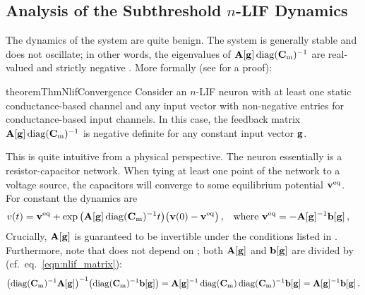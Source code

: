 \pagebreak

\subsection{Analysis of the Subthreshold $n$-LIF Dynamics}
\label{sec:nlif_subth_properties}

The dynamics of the \nlif system are quite benign.
The system is generally stable and does not oscillate; in other words, the eigenvalues of $\mathbf{A}[\mathbf{g}] \operatorname{\mathrm{diag}}({{\mathbf{C}}_\mathrm{m}})^{-1}$ are real-valued and strictly negative \citep[e.g.,][Chapter~5]{strogatz1994nonlinear}.
More formally (see  for a proof):
\begin{restatable}{theorem}{ThmNlifConvergence}
\label{thm:nlif_convergence}
Consider an $n$-LIF neuron with at least one static conductance-based channel and any input vector \vng with non-negative entries for conductance-based input channels.
In this case, the feedback matrix $\mathbf{A}[\mathbf{g}] \operatorname{\mathrm{diag}}({{\mathbf{C}}_\mathrm{m}})^{-1}$ is negative definite for any constant input vector $\mathbf{g}$.
\end{restatable}
This is quite intuitive from a physical perspective.
The \nlif neuron essentially is a resistor-capacitor network.
When tying at least one point of the network to a voltage source, the capacitors will converge to some equilibrium potential $\mathbf{v}^\mathrm{eq}$.
For constant \vng the dynamics are
\begin{align}
	{{\ensuremath{v}}}(t)
		&= \mathbf{v}^\mathrm{eq} + \exp\big(\mathbf{A}[\mathbf{g}] \operatorname{\mathrm{diag}}({{\mathbf{C}}_\mathrm{m}})^{-1} t\big) \big({\mathbf{v}}(0) - \mathbf{v}^\mathrm{eq}\big) \,,
		& \text{where }  \mathbf{v}^\mathrm{eq} &= -\mathbf{A}[\mathbf{g}]^{-1} \mathbf{b}[\mathbf{g}] \,,
	\label{eqn:nlif_dynamics}
\end{align}
Crucially, $\mathbf{A}[\mathbf{g}]$ is guaranteed to be invertible under the conditions listed in .
Furthermore, note that \vneq does not depend on \vCm; both $\mathbf{A}[\mathbf{g}]$ and $\mathbf{b}[\mathbf{g}]$ are divided by \vCm (cf.~eq.~\ref{eqn:nlif_matrix}):
\begin{align*}
	  \bigl(\operatorname{\mathrm{diag}}({{\mathbf{C}}_\mathrm{m}})^{-1} \mathbf{A}[\mathbf{g}]\bigr)^{-1} \bigl(\operatorname{\mathrm{diag}}({{\mathbf{C}}_\mathrm{m}})^{-1} \mathbf{b}[\mathbf{g}]\bigr)
	= \mathbf{A}[\mathbf{g}]^{-1} \operatorname{\mathrm{diag}}({{\mathbf{C}}_\mathrm{m}}) \operatorname{\mathrm{diag}}({{\mathbf{C}}_\mathrm{m}})^{-1} \mathbf{b}[\mathbf{g}] = \mathbf{A}[\mathbf{g}]^{-1} \mathbf{b}[\mathbf{g}] \,.
\end{align*} 

